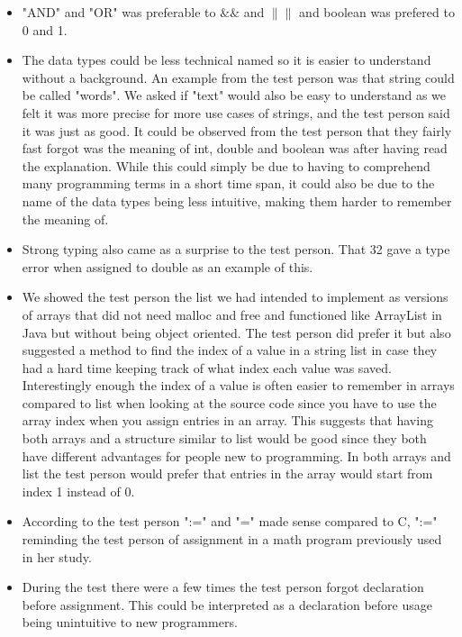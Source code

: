 \begin{itemize}
    \item "AND" and "OR" was preferable to  $\&\&$ and $\|\|$ and boolean was prefered to 0 and 1. 
    \item The data types could be less technical named so it is easier to understand without a background. An example from the test person was that string could be called "words". We asked if "text" would also be easy to understand as we felt it was more precise for more use cases of strings, and the test person said it was just as good. It could be observed from the test person that they fairly fast forgot was the meaning of int, double and boolean was after having read the explanation. While this could simply be due to having to comprehend many programming terms in a short time span, it could also be due to the name of the data types being less intuitive, making them harder to remember the meaning of.
    \item Strong typing also came as a surprise to the test person. That 32 gave a type error when assigned to double as an example of this.
    \item We showed the test person the list we had intended to implement as versions of arrays that did not need malloc and free and functioned like ArrayList in Java but without being object oriented. The test person did prefer it but also suggested a method to find the index of a value in a string list in case they had a hard time keeping track of what index each value was saved. Interestingly enough the index of a value is often easier to remember in arrays compared to list when looking at the source code since you have to use the array index when you assign entries in an array. This suggests that having both arrays and a structure similar to list would be good since they both have different advantages for people new to programming. In both arrays and list the test person would prefer that entries in the array would start from index 1 instead of 0.
    \item According to the test person ":=" and "=" made sense compared to C, ":=" reminding the test person of assignment in a math program previously used in her study.
    \item During the test there were a few times the test person forgot declaration before assignment. This could be interpreted as a declaration before usage being unintuitive to new programmers. 
\end{itemize}

